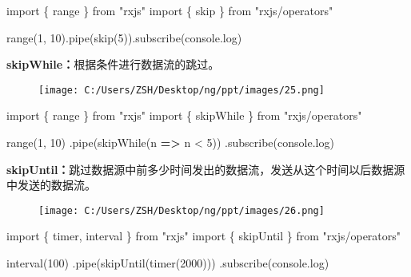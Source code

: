 \documentclass[
]{article}
\newenvironment{Shaded}{}{}
\newcommand{\BuiltInTok}[1]{#1}
\newcommand{\DecValTok}[1]{\textcolor[rgb]{0.25,0.63,0.44}{#1}}
\newcommand{\FunctionTok}[1]{\textcolor[rgb]{0.02,0.16,0.49}{#1}}
\newcommand{\ImportTok}[1]{#1}
\newcommand{\KeywordTok}[1]{\textcolor[rgb]{0.00,0.44,0.13}{\textbf{#1}}}
\newcommand{\NormalTok}[1]{#1}
\newcommand{\OperatorTok}[1]{\textcolor[rgb]{0.40,0.40,0.40}{#1}}
\newcommand{\StringTok}[1]{\textcolor[rgb]{0.25,0.44,0.63}{#1}}
\begin{document}
\begin{Shaded}
\begin{Highlighting}[]
\ImportTok{import}\NormalTok{ \{ range \} }\ImportTok{from} \StringTok{"rxjs"}
\ImportTok{import}\NormalTok{ \{ skip \} }\ImportTok{from} \StringTok{"rxjs/operators"}

\FunctionTok{range}\NormalTok{(}\DecValTok{1}\OperatorTok{,} \DecValTok{10}\NormalTok{)}\OperatorTok{.}\FunctionTok{pipe}\NormalTok{(}\FunctionTok{skip}\NormalTok{(}\DecValTok{5}\NormalTok{))}\OperatorTok{.}\FunctionTok{subscribe}\NormalTok{(}\BuiltInTok{console}\OperatorTok{.}\FunctionTok{log}\NormalTok{)}
\end{Highlighting}
\end{Shaded}

\textbf{skipWhile：}根据条件进行数据流的跳过。

\begin{figure}
\centering
\texttt{[image: C:/Users/ZSH/Desktop/ng/ppt/images/25.png]}
\caption{}
\end{figure}

\begin{Shaded}
\begin{Highlighting}[]
\ImportTok{import}\NormalTok{ \{ range \} }\ImportTok{from} \StringTok{"rxjs"}
\ImportTok{import}\NormalTok{ \{ skipWhile \} }\ImportTok{from} \StringTok{"rxjs/operators"}

\FunctionTok{range}\NormalTok{(}\DecValTok{1}\OperatorTok{,} \DecValTok{10}\NormalTok{)}
  \OperatorTok{.}\FunctionTok{pipe}\NormalTok{(}\FunctionTok{skipWhile}\NormalTok{(n }\KeywordTok{=\textgreater{}}\NormalTok{ n }\OperatorTok{\textless{}} \DecValTok{5}\NormalTok{))}
  \OperatorTok{.}\FunctionTok{subscribe}\NormalTok{(}\BuiltInTok{console}\OperatorTok{.}\FunctionTok{log}\NormalTok{)}
\end{Highlighting}
\end{Shaded}

\textbf{skipUntil：}跳过数据源中前多少时间发出的数据流，发送从这个时间以后数据源中发送的数据流。

\begin{figure}
\centering
\texttt{[image: C:/Users/ZSH/Desktop/ng/ppt/images/26.png]}
\caption{}
\end{figure}

\begin{Shaded}
\begin{Highlighting}[]
\ImportTok{import}\NormalTok{ \{ timer}\OperatorTok{,}\NormalTok{ interval \} }\ImportTok{from} \StringTok{"rxjs"}
\ImportTok{import}\NormalTok{ \{ skipUntil \} }\ImportTok{from} \StringTok{"rxjs/operators"}

\FunctionTok{interval}\NormalTok{(}\DecValTok{100}\NormalTok{)}
  \OperatorTok{.}\FunctionTok{pipe}\NormalTok{(}\FunctionTok{skipUntil}\NormalTok{(}\FunctionTok{timer}\NormalTok{(}\DecValTok{2000}\NormalTok{)))}
  \OperatorTok{.}\FunctionTok{subscribe}\NormalTok{(}\BuiltInTok{console}\OperatorTok{.}\FunctionTok{log}\NormalTok{)}
\end{Highlighting}
\end{Shaded}
\end{document}
